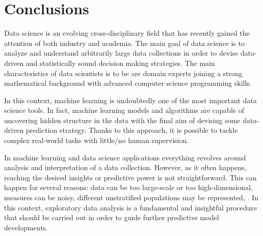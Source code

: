
\chapter{Conclusions} \label{chap:conclusions}

Data science is an evolving cross-disciplinary field that has recently gained the attention of both industry and academia.
The main goal of data science is to analyze and understand arbitrarily large data collections in order to devise data-driven and statistically sound decision making strategies.
The main characteristics of data scientists is to be are domain experts joining a strong mathematical background with advanced computer science programming skills.

In this context, machine learning is undoubtedly one of the most important data science tools.
In fact, machine learning models and algorithms are capable of uncovering hidden structure in the data with the final aim of devising some data-driven prediction strategy.
Thanks to this approach, it is possible to tackle complex real-world tasks with little/no human supervision.

In machine learning and data science applications everything revolves around analysis and interpretation of a data collection.
However, as it often happens, reaching the desired insights or predictive power is not straightforward.
This can happen for several reasons: \eg data can be too large-scale or too high-dimensional, measures can be noisy, different unstratified populations may be represented, \etc.
In this context, exploratory data analysis is a fundamental and insightful procedure that should be carried out in order to guide further predictive model developments.

